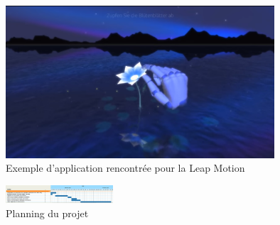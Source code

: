 \begin{figure}
  \begin{center}
    \includegraphics[width=10cm]{images/exampleHand.png}
    \caption{Exemple d'application rencontrée pour la Leap Motion}
    \label{fig:example}
  \end{center}
\end{figure}

\begin{figure}
  \begin{center}
    \includegraphics[angle=-90, width=4cm]{images/planning.png}
    \caption{Planning du projet}
    \label{fig:planning}
  \end{center}
\end{figure}
